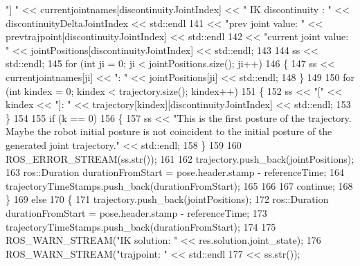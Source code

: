 \begin{DoxyCode}
       \textcolor{stringliteral}{"] "} << currentjointnames[discontinuityJointIndex] << \textcolor{stringliteral}{" IK discontinuity : "} << 
      discontinuityDeltaJointIndex << std::endl
141                             << \textcolor{stringliteral}{"prev joint value: "} << prevtrajpoint[discontinuityJointIndex] << std::endl
142                             << \textcolor{stringliteral}{"current joint value: "} << jointPositions[discontinuityJointIndex] << 
      std::endl;
143 
144                         ss << std::endl;
145                         \textcolor{keywordflow}{for} (\textcolor{keywordtype}{int} ji = 0; ji < jointPositions.size(); ji++)
146                         \{
147                             ss << currentjointnames[ji] << \textcolor{stringliteral}{": "} << jointPositions[ji] << std::endl;
148                         \}
149 
150                         \textcolor{keywordflow}{for} (\textcolor{keywordtype}{int} kindex = 0; kindex < trajectory.size(); kindex++)
151                         \{
152                             ss << \textcolor{stringliteral}{"["} << kindex << \textcolor{stringliteral}{"]: "} << trajectory[kindex][discontinuityJointIndex] << 
      std::endl;
153                         \}
154 
155                         \textcolor{keywordflow}{if} (k == 0)
156                         \{
157                             ss << \textcolor{stringliteral}{"This is the first posture of the trajectory. Maybe the robot initial
       posture is not coincident to the initial posture of the generated joint trajectory."} << std::endl;
158                         \}
159 
160                         ROS\_ERROR\_STREAM(ss.str());
161 
162                         trajectory.push\_back(jointPositions);
163                         ros::Duration durationFromStart = pose.header.stamp - referenceTime;
164                         trajectoryTimeStamps.push\_back(durationFromStart);
165 
166                         
167                         \textcolor{keywordflow}{continue};
168                     \}
169                     \textcolor{keywordflow}{else}
170                     \{
171                         trajectory.push\_back(jointPositions);
172                         ros::Duration durationFromStart = pose.header.stamp - referenceTime;
173                         trajectoryTimeStamps.push\_back(durationFromStart);
174 
175                         ROS\_WARN\_STREAM(\textcolor{stringliteral}{"IK solution: "} << res.solution.joint\_state);
176                         ROS\_WARN\_STREAM(\textcolor{stringliteral}{"trajpoint: "} << std::endl
177                             << ss.str());

\end{DoxyCode}
